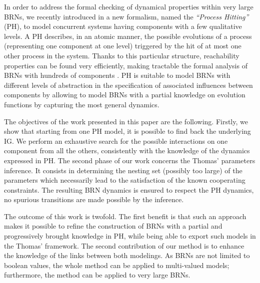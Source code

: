 In order to address the formal checking of dynamical properties within very large BRNs, we recently
introduced in \cite{PMR10-TCSB} a new formalism, named the \emph{``Process Hitting''} (PH), to model
concurrent systems having components with a few qualitative levels.
A PH describes, in an atomic manner, the possible evolutions of a process (representing one
component at one level) triggered by the hit of at most one other process in the system.
Thanks to this particular structure, reachability properties can be found very efficiently,
making tractable the formal analysis of BRNs with hundreds of components \cite{PMR12-MSCS}.
PH is suitable to model BRNs with different levels of abstraction in the specification of
associated influences between components by allowing to model BRNs with a partial knowledge on
evolution functions by capturing the most general dynamics.

The objectives of the work presented in this paper are the following.
Firstly, we show that starting from one PH model, it is possible to find back the underlying IG.
We perform an exhaustive search for the possible interactions on one component from all the
others, consistently with the knowledge of the dynamics expressed in PH.
The second phase of our work concerns the Thomas' parameters inference.
It consists in determining the nesting set (possibly too large) of the parameters which necessarily
lead to the satisfaction of the known cooperating constraints.
The resulting BRN dynamics is ensured to respect the PH dynamics, \ie no spurious transitions are
made possible by the inference.

The outcome of this work is twofold.
The first benefit is that such an approach makes it possible to refine the construction of
BRNs with a partial and progressively brought knowledge in PH, while being able to export such
models in the Thomas' framework.
The second contribution of our method is to enhance the knowledge of the links between both modelings.
As BRNs are not limited to boolean values, the whole method can be applied to multi-valued models;
furthermore, the method can be applied to very large BRNs.

